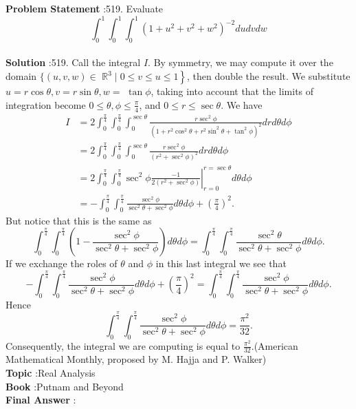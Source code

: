 \documentclass[10pt]{article}
\begin{document}
\textbf{Problem Statement} :519. Evaluate$$ \int_{0}^{1} \int_{0}^{1} \int_{0}^{1}\left(1+u^{2}+v^{2}+w^{2}\right)^{-2} d u d v d w $$\\
\textbf{Solution} :519. Call the integral $I$. By symmetry, we may compute it over the domain $\{(u, v, w) \in$ $\left.\mathbb{R}^{3} \mid 0 \leq v \leq u \leq 1\right\}$, then double the result. We substitute $u=r \cos \theta, v=r \sin \theta, w=$ $\tan \phi$, taking into account that the limits of integration become $0 \leq \theta, \phi \leq \frac{\pi}{4}$, and $0 \leq r \leq \sec \theta$. We have$$ \begin{aligned} I &=2 \int_{0}^{\frac{\pi}{4}} \int_{0}^{\frac{\pi}{4}} \int_{0}^{\sec \theta} \frac{r \sec ^{2} \phi}{\left(1+r^{2} \cos ^{2} \theta+r^{2} \sin ^{2} \theta+\tan ^{2} \phi\right)^{2}} d r d \theta d \phi \\ &=2 \int_{0}^{\frac{\pi}{4}} \int_{0}^{\frac{\pi}{4}} \int_{0}^{\sec \theta} \frac{r \sec ^{2} \phi}{\left(r^{2}+\sec ^{2} \phi\right)^{2}} d r d \theta d \phi \\ &=\left.2 \int_{0}^{\frac{\pi}{4}} \int_{0}^{\frac{\pi}{4}} \sec ^{2} \phi \frac{-1}{2\left(r^{2}+\sec ^{2} \phi\right)}\right|_{r=0} ^{r=\sec \theta} d \theta d \phi \\ &=-\int_{0}^{\frac{\pi}{4}} \int_{0}^{\frac{\pi}{4}} \frac{\sec ^{2} \phi}{\sec ^{2} \theta+\sec ^{2} \phi} d \theta d \phi+\left(\frac{\pi}{4}\right)^{2} . \end{aligned} $$But notice that this is the same as$$ \int_{0}^{\frac{\pi}{4}} \int_{0}^{\frac{\pi}{4}}\left(1-\frac{\sec ^{2} \phi}{\sec ^{2} \theta+\sec ^{2} \phi}\right) d \theta d \phi=\int_{0}^{\frac{\pi}{4}} \int_{0}^{\frac{\pi}{4}} \frac{\sec ^{2} \theta}{\sec ^{2} \theta+\sec ^{2} \phi} d \theta d \phi . $$If we exchange the roles of $\theta$ and $\phi$ in this last integral we see that$$ -\int_{0}^{\frac{\pi}{4}} \int_{0}^{\frac{\pi}{4}} \frac{\sec ^{2} \phi}{\sec ^{2} \theta+\sec ^{2} \phi} d \theta d \phi+\left(\frac{\pi}{4}\right)^{2}=\int_{0}^{\frac{\pi}{4}} \int_{0}^{\frac{\pi}{4}} \frac{\sec ^{2} \phi}{\sec ^{2} \theta+\sec ^{2} \phi} d \theta d \phi . $$Hence$$ \int_{0}^{\frac{\pi}{4}} \int_{0}^{\frac{\pi}{4}} \frac{\sec ^{2} \phi}{\sec ^{2} \theta+\sec ^{2} \phi} d \theta d \phi=\frac{\pi^{2}}{32} . $$Consequently, the integral we are computing is equal to $\frac{\pi^{2}}{32}$.(American Mathematical Monthly, proposed by M. Hajja and P. Walker)\\
\textbf{Topic} :Real Analysis\\
\textbf{Book} :Putnam and Beyond\\
\textbf{Final Answer} :\\
\end{document}
